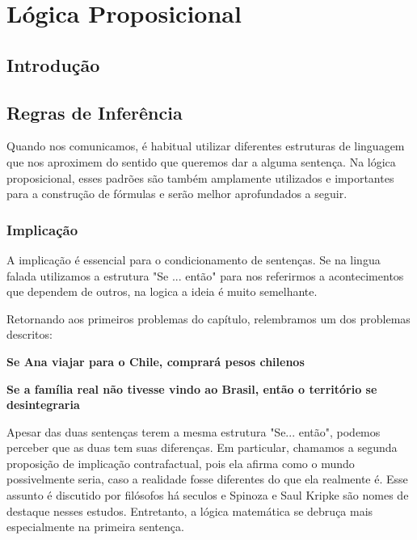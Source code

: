 \chapter{Lógica Proposicional}
\section{Introdução}

\section{Regras de Inferência}
Quando nos comunicamos, é habitual utilizar diferentes estruturas de linguagem que nos aproximem do sentido que queremos dar a alguma sentença. Na lógica proposicional, esses padrões são também amplamente utilizados e importantes para a construção de fórmulas e serão melhor aprofundados a seguir.

\subsection{Implicação} 
A implicação é essencial para o condicionamento de sentenças. Se na lingua falada utilizamos a estrutura "Se ... então" para nos referirmos a acontecimentos que dependem de outros, na logica a ideia é muito semelhante.

Retornando aos primeiros problemas do capítulo, relembramos um dos problemas descritos: %
\begin{center}
\textbf{Se Ana viajar para o Chile, comprará pesos chilenos}

\textbf{Se a família real não tivesse vindo ao Brasil, então o território se desintegraria}
\end{center}

Apesar das duas sentenças terem a mesma estrutura "Se... então", podemos perceber que as duas tem suas diferenças. Em particular, chamamos a segunda proposição de implicação contrafactual, pois ela afirma como o mundo possivelmente seria, caso a realidade fosse diferentes do que ela realmente é. Esse assunto é discutido por filósofos há seculos e Spinoza e Saul Kripke são nomes de destaque nesses estudos. Entretanto, a lógica matemática se debruça mais especialmente na primeira sentença.

